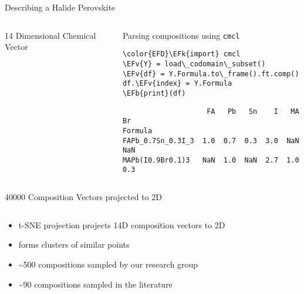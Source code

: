\documentclass[10pt, aspectratio=169, presentation]{beamer}
\newcommand{\EFk}[1]{\textcolor{EFk}{#1}} %
\newcommand{\EFb}[1]{\textcolor{EFb}{#1}} %
\newcommand{\EFv}[1]{\textcolor{EFv}{#1}} %
\begin{document}
\begin{frame}[label={sec:org0e9f8a0},fragile]{Describing a Halide Perovskite}
 \begin{columns}
\begin{column}{0.45\columnwidth}
\begin{block}{14 Dimensional Chemical Vector}
 
\begin{center}

\end{center}
\end{block}
\end{column}

\begin{column}{0.55\columnwidth}
\begin{block}{Parsing compositions using \texttt{cmcl}}
\begin{Code}
\begin{Verbatim}
\color{EFD}\EFk{import} cmcl
\EFv{Y} = load\_codomain\_subset()
\EFv{df} = Y.Formula.to\_frame().ft.comp()
df.\EFv{index} = Y.Formula
\EFb{print}(df)
\end{Verbatim}
\end{Code}

\begin{small}
\begin{verbatim}
                    FA   Pb   Sn    I   MA   Br
Formula                                        
FAPb_0.7Sn_0.3I_3  1.0  0.7  0.3  3.0  NaN  NaN
MAPb(I0.9Br0.1)3   NaN  1.0  NaN  2.7  1.0  0.3
\end{verbatim}
\end{small}
\end{block}
\end{column}
\end{columns}
\end{frame}

\begin{frame}[label={sec:org3c59447}]{40000 Composition Vectors projected to 2D}
\begin{columns}
\begin{column}{0.4\columnwidth}
\begin{itemize}
\item t-SNE projection projects 14D composition vectors to 2D
\item forms clusters of similar points
\item \textasciitilde{}500 compositions sampled by our research group
\autocite{yang-2023-high-throug}
\item \textasciitilde{}90 compositions sampled in the literature
\autocite{almora-2020-devic-perfor}
\end{itemize}
\end{column}

\begin{column}{0.6\columnwidth}
 
\begin{center}

\end{center}
\end{column}
\end{columns}
\end{frame}
\end{document}

